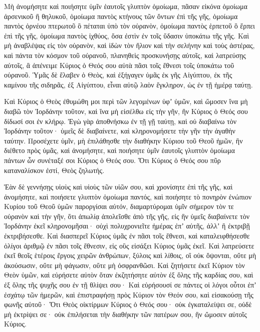 {Μὴ ἀνομήσητε καὶ ποιήσητε ὑμῖν ἑαυτοῖς γλυπτὸν ὁμοίωμα, πᾶσαν εἰκόνα ὁμοίωμα ἀρσενικοῦ ἢ θηλυκοῦ,
ὁμοίωμα παντὸς κτήνους τῶν ὄντων ἐπὶ τῆς γῆς, ὁμοίωμα παντὸς ὀρνέου πτερωτοῦ ὃ πέταται ὑπὸ τὸν οὐρανὸν,
ὁμοίωμα παντὸς ἑρπετοῦ ὃ ἕρπει ἐπὶ τῆς γῆς, ὁμοίωμα παντὸς ἰχθύος, ὅσα ἐστὶν ἐν τοῖς ὕδασιν ὑποκάτω τῆς γῆς.
Καὶ μὴ ἀναβλέψας εἰς τὸν οὐρανὸν, καὶ ἰδὼν τὸν ἥλιον καὶ τὴν σελήνην καὶ τοὺς ἀστέρας, καὶ πάντα τὸν κόσμον τοῦ οὐρανοῦ, πλανηθεὶς προσκυνήσῃς αὐτοῖς, καὶ λατρεύσῃς αὐτοῖς, ἃ ἀπένειμε Κύριος ὁ Θεός σου αὐτὰ πᾶσι τοῖς ἔθνεσι τοῖς ὑποκάτω τοῦ οὐρανοῦ.
Ὑμᾶς δὲ ἔλαβεν ὁ Θεὸς, καὶ ἐξήγαγεν ὑμᾶς ἐκ γῆς Αἰγύπτου, ἐκ τῆς καμίνου τῆς σιδηρᾶς, ἐξ Αἰγύπτου, εἶναι αὐτῷ λαὸν ἔγκληρον, ὡς ἐν τῇ ἡμέρᾳ ταύτῃ.
\par }{\PP {}Καὶ Κύριος ὁ Θεὸς ἐθυμώθη μοι περὶ τῶν λεγομένων ὑφʼ ὑμῶν, καὶ ὤμοσεν ἵνα μὴ διαβῶ τὸν Ἰορδάνην τοῦτον, καὶ ἵνα μὴ εἰσέλθω εἰς τὴν γῆν, ἣν Κύριος ὁ Θεός σου δίδωσί σοι ἐν κλήρῳ.
Ἐγὼ γὰρ ἀποθνήσκω ἐν τῇ γῇ ταύτῃ, καὶ οὐ διαβαίνω τὸν Ἰορδάνην τοῦτον· ὑμεῖς δὲ διαβαίνετε, καὶ κληρονομήσετε τὴν γῆν τὴν ἀγαθὴν ταύτην.
Προσέχετε ὑμῖν, μὴ ἐπιλάθησθε τὴν διαθήκην Κύριου τοῦ Θεοῦ ἡμῶν, ἣν διέθετο πρὸς ὑμᾶς, καὶ ἀνομήσητε, καὶ ποιήσητε ὑμῖν ἑαυτοῖς γλυπτὸν ὁμοίωμα πάντων ὧν συνέταξέ σοι Κύριος ὁ Θεός σου.
Ὅτι Κύριος ὁ Θεός σου πῦρ καταναλίσκον ἐστί, Θεὸς ζηλωτής.
\par }{\PP {}Ἐὰν δὲ γεννήσῃς υἱοὺς καὶ υἱοὺς τῶν υἱῶν σου, καὶ χρονίσητε ἐπὶ τῆς γῆς, καὶ ἀνομήσητε, καὶ ποιήσετε γλυπτὸν ὁμοίωμα παντός, καὶ ποιήσητε τὸ πονηρὸν ἐνώπιον Κυρίου τοῦ
Θεοῦ ὑμῶν παροργίσαι αὐτόν, διαμαρτύρομαι ὑμῖν σήμερον τὸν τε οὐρανὸν καὶ τὴν γῆν, ὅτι ἀπωλίᾳ ἀπολεῖσθε ἀπὸ τῆς γῆς, εἰς ἣν ὑμεῖς διαβαίνετε τὸν Ἰορδάνην ἐκεῖ κληρονομῆσαι· οὐχὶ πολυχρονιεῖτε ἡμέρας ἐπʼ αὐτῆς, ἀλλʼ ἢ ἐκτριβῇ ἐκτριβήσεσθε.
Καὶ διασπερεῖ Κύριος ὑμᾶς ἐν πᾶσι τοῖς ἔθνεσι, καὶ καταλειφθήσεσθε ὀλίγοι ἀριθμῷ ἐν πᾶσι τοῖς ἔθνεσιν, εἰς οὓς εἰσάξει Κύριος ὑμᾶς ἐκεῖ.
Καὶ λατρεύσετε ἐκεῖ θεοῖς ἑτέροις ἔργοις χειρῶν ἀνθρώπων, ξύλοις καὶ λίθοις, οἳ οὐκ ὄψονται, οὔτε μὴ ἀκούσωσιν, οὔτε μὴ φάγωσιν, οὔτε μὴ ὀσφρανθῶσι.
Καὶ ζητήσετε ἐκεῖ Κύριον τὸν Θεὸν ὑμῶν, καὶ εὑρήσετε αὐτὸν ὅταν ἐκζητήσητε αὐτὸν ἐξ ὅλης τῆς καρδίας σου, καὶ ἐξ ὅλης τῆς ψυχῆς σου ἐν τῇ θλίψει σου·
Καὶ εὑρήσουσί σε πάντες οἱ λόγοι οὗτοι ἐπʼ ἐσχάτῳ τῶν ἡμερῶν, καὶ ἐπιστραφήσῃ πρὸς Κύριον τὸν Θεόν σου, καὶ εἰσακούσῃ τῆς φωνῆς αὐτοῦ·
Ὅτι Θεὸς οἰκτίρμων Κύριος ὁ Θεός σου· οὐκ ἐγκαταλείψει σε, οὐδὲ μὴ ἐκτρίψει σε· οὐκ ἐπιλήσεται τὴν διαθήκην τῶν πατέρων σου, ἣν ὤμοσεν αὐτοῖς Κύριος.
}
